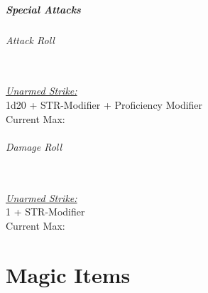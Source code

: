 \documentclass[letterpaper,openany,oneside,twocolumn]{book}
\newcommand{\PATH}{../../}
\begin{document}
\subsubsection*{Special Attacks}
\paragraph*{Attack Roll}\hfill\\
\underline{\textit{Unarmed Strike:}}\\
1d20 + STR-Modifier + Proficiency Modifier\\
\indent Current Max: 
\paragraph*{Damage Roll}\hfill\\
\underline{\textit{Unarmed Strike:}}\\
1 + STR-Modifier\\
\indent Current Max: 

\part*{Magic Items}

\end{document}

